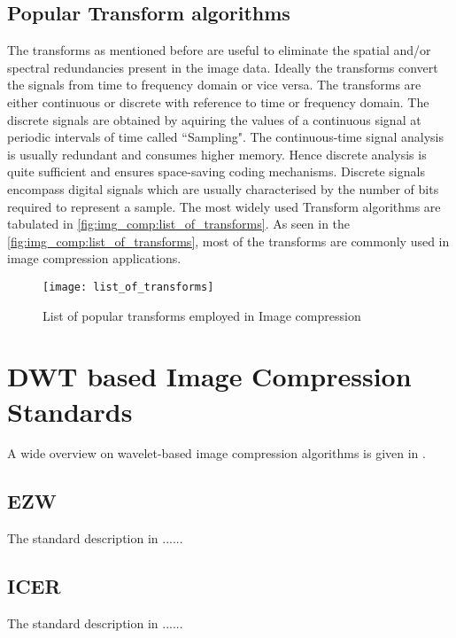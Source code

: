 \subsection{Popular Transform algorithms}
The transforms as mentioned before are useful to eliminate the spatial and/or spectral redundancies present in the image data. Ideally the transforms convert the signals from time to frequency domain or vice versa. The transforms are either continuous or discrete with reference to time or frequency domain. The discrete signals are obtained by aquiring the values of a continuous signal at periodic intervals of time called ``Sampling". The continuous-time signal analysis is usually redundant and consumes higher memory. Hence discrete analysis is quite sufficient and ensures space-saving coding mechanisms. Discrete signals encompass digital signals which are usually characterised by the number of bits required to represent a sample. The most widely used Transform algorithms are tabulated in \autoref{fig:img_comp:list_of_transforms}\cite{LeonidP.Yaroslavsky}. As seen in the \autoref{fig:img_comp:list_of_transforms}, most of the transforms are commonly used in image compression applications. 
\begin{figure}[tb]
  \centering
  \texttt{[image: list\_of\_transforms]}
  \caption{List of popular transforms employed in Image compression}
  \label{fig:img_comp:list_of_transforms}
\end{figure}

\section{\gls{DWT} based Image Compression Standards\label{sec:2.2}}
A wide overview on wavelet-based image compression algorithms is given in \cite{Sudhakar2006}.
\subsection{\gls{EZW}\label{ezw}}
The standard description in \cite{Shapiro1993} ......
\subsection{\gls{ICER}\label{icer}}
The standard description in \cite{A.Kiely} ......

